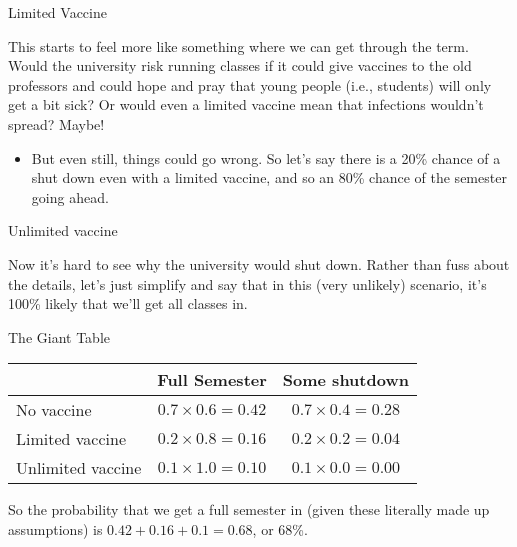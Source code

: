 \documentclass[
  ignorenonframetext,
]{beamer}
\providecommand{\tightlist}{%
  \setlength{\itemsep}{0pt}\setlength{\parskip}{0pt}}
\renewcommand{\,}{\text{, }}
\begin{document}
\begin{frame}{Limited Vaccine}
\protect\hypertarget{limited-vaccine}{}

This starts to feel more like something where we can get through the
term. Would the university risk running classes if it could give
vaccines to the old professors and could hope and pray that young people
(i.e., students) will only get a bit sick? Or would even a limited
vaccine mean that infections wouldn't spread? Maybe!

\begin{itemize}
\tightlist
\item
  But even still, things could go wrong. So let's say there is a 20\%
  chance of a shut down even with a limited vaccine, and so an 80\%
  chance of the semester going ahead.
\end{itemize}

\end{frame}

\begin{frame}{Unlimited vaccine}
\protect\hypertarget{unlimited-vaccine}{}

Now it's hard to see why the university would shut down. Rather than
fuss about the details, let's just simplify and say that in this (very
unlikely) scenario, it's 100\% likely that we'll get all classes in.

\end{frame}

\begin{frame}{The Giant Table}
\protect\hypertarget{the-giant-table}{}

\begin{longtable}[]{@{}lcc@{}}
\toprule
& Full Semester & Some shutdown\tabularnewline
\midrule
\endhead
No vaccine & \(0.7 \times 0.6 = 0.42\) &
\(0.7 \times 0.4 = 0.28\)\tabularnewline
Limited vaccine & \(0.2 \times 0.8 = 0.16\) &
\(0.2 \times 0.2 = 0.04\)\tabularnewline
Unlimited vaccine & \(0.1 \times 1.0 = 0.10\) &
\(0.1 \times 0.0 = 0.00\)\tabularnewline
\bottomrule
\end{longtable}

So the probability that we get a full semester in (given these literally
made up assumptions) is \(0.42 + 0.16 + 0.1 = 0.68\), or 68\%.

\end{frame}
\end{document}
